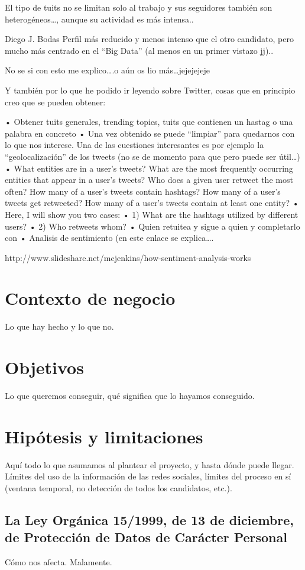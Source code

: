 \documentclass[11pt,a4paper,leqno,titlepage,twoside]{book}
\begin{document}
El tipo de tuits no se limitan solo al trabajo y sus seguidores tambi\'en son heterog\'eneos…, aunque su actividad es m\'as intensa..


Diego J. Bodas
Perfil m\'as reducido y menos intenso que el otro candidato, pero mucho m\'as centrado en el “Big Data” (al menos en un primer vistazo jj)..

No se si con esto me explico….o a\'un os lio m\'as…jejejejeje

Y tambi\'en por lo que he podido ir leyendo sobre Twitter, cosas que en principio creo que se pueden obtener:

•	Obtener tuits generales, trending topics, tuits que contienen un hastag o una palabra en concreto
•	Una vez obtenido se puede “limpiar” para quedarnos con lo que nos interese. Una de las cuestiones interesantes es por ejemplo la “geolocalizaci\'on” de los tweets (no se de momento para que pero puede ser \'util…)
•	What entities are in a user's tweets?
What are the most frequently occurring entities that appear in a user's tweets?
Who does a given user retweet the most often?
How many of a user's tweets contain hashtags?
How many of a user's tweets get retweeted?
How many of a user's tweets contain at least one entity?
•	Here, I will show you two cases:
•	1) What are the hashtags utilized by different users?
•	2) Who retweets whom?
•	Quien retuitea y sigue a quien y completarlo con
•	Analisis de sentimiento
(en este enlace se explica….

http://www.slideshare.net/mcjenkins/how-sentiment-analysis-works





\section{Contexto de negocio}
Lo que hay hecho y lo que no.
\section{Objetivos}
Lo que queremos conseguir, qué significa que lo hayamos conseguido.
\section{Hip\'otesis y limitaciones}
Aquí todo lo que asumamos al plantear el proyecto, y hasta dónde puede llegar. Límites del uso de la información
de las redes sociales, límites del proceso en sí (ventana temporal, no detección de todos los candidatos, etc.).
\subsection{La Ley Orgánica 15/1999, de 13 de diciembre, de Protección de Datos
de Carácter Personal}
Cómo nos afecta. Malamente.
\end{document}
